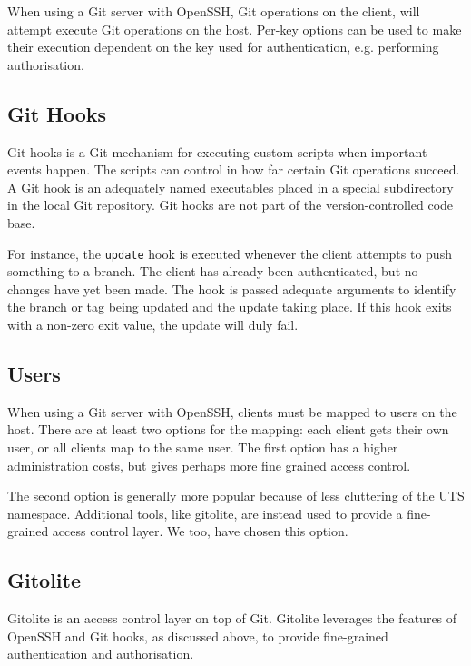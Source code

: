 When using a Git server with OpenSSH, Git operations on the client, will
attempt execute Git operations on the host. Per-key options can be used to make
their execution dependent on the key used for authentication, e.g. performing
authorisation.

\subsection{Git Hooks}

Git hooks is a Git mechanism for executing custom scripts when important events
happen\cite{man-5-githooks}. The scripts can control in how far certain Git
operations succeed. A Git hook is an adequately named executables placed in a
special subdirectory in the local Git repository. Git hooks are not part of the
version-controlled code base.

For instance, the \texttt{update} hook is executed whenever the client attempts
to push something to a branch. The client has already been authenticated, but
no changes have yet been made. The hook is passed adequate arguments to
identify the branch or tag being updated and the update taking place. If this
hook exits with a non-zero exit value, the update will duly fail.

\subsection{Users}

When using a Git server with OpenSSH, clients must be mapped to users on the
host. There are at least two options for the mapping: each client gets their
own user, or all clients map to the same user. The first option has a higher
administration costs, but gives perhaps more fine grained access control.

The second option is generally more popular because of less cluttering of the
UTS namespace. Additional tools, like gitolite, are instead used to provide a
fine-grained access control layer. We too, have chosen this option.

\subsection{Gitolite}

Gitolite is an access control layer on top of Git\cite{gitolite-com-2014a}.
Gitolite leverages the features of OpenSSH and Git hooks, as discussed above,
to provide fine-grained authentication and
authorisation\cite{gitolite-com-2014b}.

